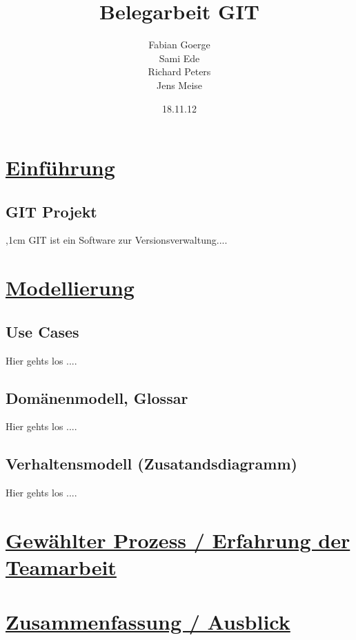 \documentclass[a4paper]{article}
\begin{document}
\title{\textbf{{\Huge Belegarbeit GIT}}}
\author{Fabian Goerge \\  Sami Ede \\ Richard Peters \\ Jens Meise}
\date{18.11.12}
\maketitle
\newpage
\tableofcontents
\newpage
\section{\underline{Einführung}}
\subsection{GIT Projekt}

\par
\begingroup
{},1cm 
\noindent GIT ist ein Software zur Versionsverwaltung....
\par
\endgroup


	
\section{\underline{Modellierung}}

\subsection{Use Cases}

	Hier gehts los ....
		
\subsection{Domänenmodell, Glossar}

	Hier gehts los ....
	
\subsection{Verhaltensmodell (Zusatandsdiagramm)}

	Hier gehts los ....
	
\section{\underline{Gewählter Prozess / Erfahrung der Teamarbeit}}

\section{\underline{Zusammenfassung / Ausblick}}
\end{document}
